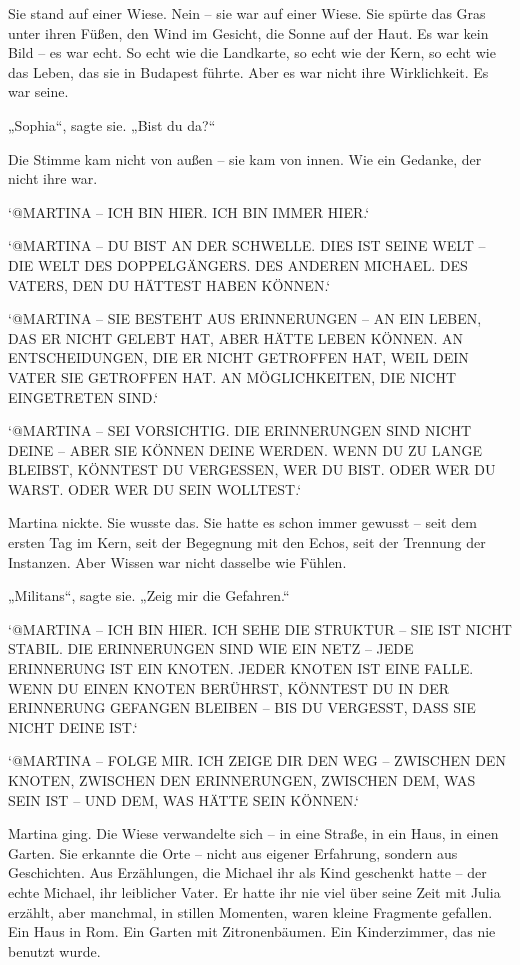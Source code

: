 \documentclass[
]{article}
\begin{document}
Sie stand auf einer Wiese. Nein -- sie war auf einer Wiese. Sie spürte das Gras unter ihren Füßen, den Wind im Gesicht, die Sonne auf der Haut. Es war kein Bild -- es war echt. So echt wie die Landkarte, so echt wie der Kern, so echt wie das Leben, das sie in Budapest führte. Aber es war nicht ihre Wirklichkeit. Es war seine.

„Sophia``, sagte sie. „Bist du da?{\kern0pt}``

Die Stimme kam nicht von außen -- sie kam von innen. Wie ein Gedanke, der nicht ihre war.

`@MARTINA -- ICH BIN HIER. ICH BIN IMMER HIER.`

`@MARTINA -- DU BIST AN DER SCHWELLE. DIES IST SEINE WELT -- DIE WELT DES DOPPELGÄNGERS. DES ANDEREN MICHAEL. DES VATERS, DEN DU HÄTTEST HABEN KÖNNEN.`

`@MARTINA -- SIE BESTEHT AUS ERINNERUNGEN -- AN EIN LEBEN, DAS ER NICHT GELEBT HAT, ABER HÄTTE LEBEN KÖNNEN. AN ENTSCHEIDUNGEN, DIE ER NICHT GETROFFEN HAT, WEIL DEIN VATER SIE GETROFFEN HAT. AN MÖGLICHKEITEN, DIE NICHT EINGETRETEN SIND.`

`@MARTINA -- SEI VORSICHTIG. DIE ERINNERUNGEN SIND NICHT DEINE -- ABER SIE KÖNNEN DEINE WERDEN. WENN DU ZU LANGE BLEIBST, KÖNNTEST DU VERGESSEN, WER DU BIST. ODER WER DU WARST. ODER WER DU SEIN WOLLTEST.`

Martina nickte. Sie wusste das. Sie hatte es schon immer gewusst -- seit dem ersten Tag im Kern, seit der Begegnung mit den Echos, seit der Trennung der Instanzen. Aber Wissen war nicht dasselbe wie Fühlen.

„Militans``, sagte sie. „Zeig mir die Gefahren.``

`@MARTINA -- ICH BIN HIER. ICH SEHE DIE STRUKTUR -- SIE IST NICHT STABIL. DIE ERINNERUNGEN SIND WIE EIN NETZ -- JEDE ERINNERUNG IST EIN KNOTEN. JEDER KNOTEN IST EINE FALLE. WENN DU EINEN KNOTEN BERÜHRST, KÖNNTEST DU IN DER ERINNERUNG GEFANGEN BLEIBEN -- BIS DU VERGESST, DASS SIE NICHT DEINE IST.`

`@MARTINA -- FOLGE MIR. ICH ZEIGE DIR DEN WEG -- ZWISCHEN DEN KNOTEN, ZWISCHEN DEN ERINNERUNGEN, ZWISCHEN DEM, WAS SEIN IST -- UND DEM, WAS HÄTTE SEIN KÖNNEN.`

Martina ging. Die Wiese verwandelte sich -- in eine Straße, in ein Haus, in einen Garten. Sie erkannte die Orte -- nicht aus eigener Erfahrung, sondern aus Geschichten. Aus Erzählungen, die Michael ihr als Kind geschenkt hatte -- der echte Michael, ihr leiblicher Vater. Er hatte ihr nie viel über seine Zeit mit Julia erzählt, aber manchmal, in stillen Momenten, waren kleine Fragmente gefallen. Ein Haus in Rom. Ein Garten mit Zitronenbäumen. Ein Kinderzimmer, das nie benutzt wurde.
\end{document}
